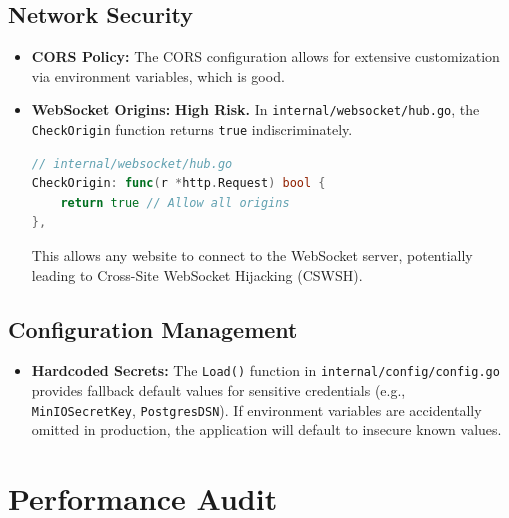 \documentclass{article}
\begin{document}
\subsection{Network Security}
\begin{itemize}
    \item \textbf{CORS Policy:} The CORS configuration allows for extensive customization via environment variables, which is good.
    \item \textbf{WebSocket Origins:} \textbf{High Risk.} In \texttt{internal/websocket/hub.go}, the \texttt{CheckOrigin} function returns \texttt{true} indiscriminately.
    \begin{lstlisting}[language=Go, basicstyle=\small]
// internal/websocket/hub.go
CheckOrigin: func(r *http.Request) bool {
    return true // Allow all origins
},
    \end{lstlisting}
    This allows any website to connect to the WebSocket server, potentially leading to Cross-Site WebSocket Hijacking (CSWSH).
\end{itemize}

\subsection{Configuration Management}
\begin{itemize}
    \item \textbf{Hardcoded Secrets:} The \texttt{Load()} function in \texttt{internal/config/config.go} provides fallback default values for sensitive credentials (e.g., \texttt{MinIOSecretKey}, \texttt{PostgresDSN}). If environment variables are accidentally omitted in production, the application will default to insecure known values.
\end{itemize}

\section{Performance Audit}
\end{document}
